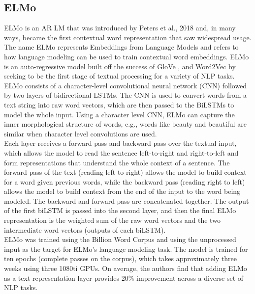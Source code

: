 \subsection{ELMo}
\label{chap:prior:sec:lm:elmo}
ELMo is an AR LM that was introduced by Peters et al., 2018 \cite{Peters2018DeepCW} and, in many ways, became the first contextual word representation that saw widespread usage. The name ELMo represents Embeddings from Language Models and refers to how language modeling can be used to train contextual word embeddings. ELMo is an auto-regressive model built off the success of GloVe \cite{Pennington2014GloveGV}, and Word2Vec \cite{Mikolov2013EfficientEO} by seeking to be the first stage of textual processing for a variety of NLP tasks. ELMo consists of a character-level convolutional neural network (CNN) followed by two layers of bidirectional LSTMs. The CNN is used to convert words from a text string into raw word vectors, which are then passed to the BiLSTMs to model the whole input. Using a character level CNN, ELMo can capture the inner morphological structure of words, e.g., words like beauty and beautiful are similar when character level convolutions are used.\\
Each layer receives a forward pass and backward pass over the textual input, which allows the model to read the sentence left-to-right and right-to-left and form representations that understand the whole context of a sentence. The forward pass of the text (reading left to right) allows the model to build context for a word given previous words, while the backward pass (reading right to left) allows the model to build context from the end of the input to the word being modeled. The backward and forward pass are concatenated together. The output of the first biLSTM is passed into the second layer, and then the final ELMo representation is the weighted sum of the raw word vectors and the two intermediate word vectors (outputs of each biLSTM).\\ 
ELMo was trained using the Billion Word Corpus \cite{Chelba2014OneBW} and using the unprocessed input as the target for ELMo's language modeling task. The model is trained for ten epochs (complete passes on the corpus), which takes approximately three weeks using three 1080ti GPUs. On average, the authors find that adding ELMo as a text representation layer provides 20\% improvement across a diverse set of NLP tasks.

